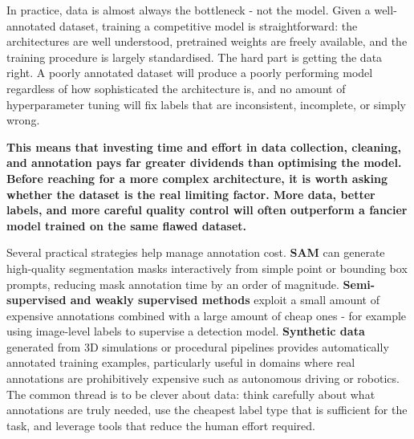 In practice, data is almost always the bottleneck - not the model. Given a well-annotated dataset, training a competitive model is straightforward: the architectures are well understood, pretrained weights are freely available, and the training procedure is largely standardised. The hard part is getting the data right. A poorly annotated dataset will produce a poorly performing model regardless of how sophisticated the architecture is, and no amount of hyperparameter tuning will fix labels that are inconsistent, incomplete, or simply wrong.

\textbf{This means that investing time and effort in data collection, cleaning, and annotation pays far greater dividends than optimising the model. Before reaching for a more complex architecture, it is worth asking whether the dataset is the real limiting factor. More data, better labels, and more careful quality control will often outperform a fancier model trained on the same flawed dataset.
}

Several practical strategies help manage annotation cost. \textbf{SAM} can generate high-quality segmentation masks interactively from simple point or bounding box prompts, reducing mask annotation time by an order of magnitude. \textbf{Semi-supervised and weakly supervised methods} exploit a small amount of expensive annotations combined with a large amount of cheap ones - for example using image-level labels to supervise a detection model. \textbf{Synthetic data} generated from 3D simulations or procedural pipelines provides automatically annotated training examples, particularly useful in domains where real annotations are prohibitively expensive such as autonomous driving or robotics. The common thread is to be clever about data: think carefully about what annotations are truly needed, use the cheapest label type that is sufficient for the task, and leverage tools that reduce the human effort required.
